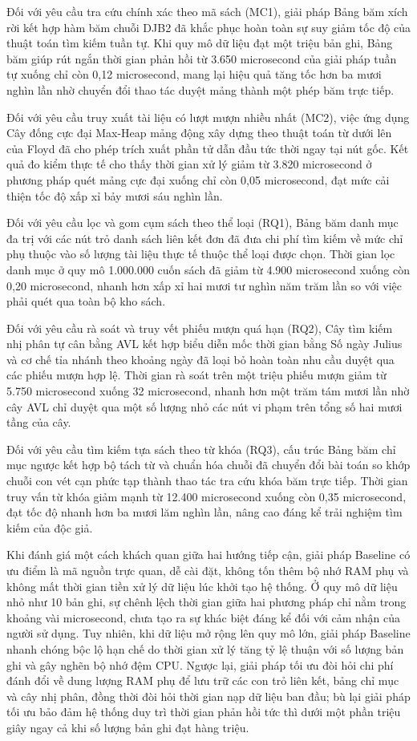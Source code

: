 \documentclass[14pt,a4paper]{extarticle}
\begin{document}
Đối với yêu cầu tra cứu chính xác theo mã sách (MC1), giải pháp Bảng băm xích rời kết hợp hàm băm chuỗi DJB2 đã khắc phục hoàn toàn sự suy giảm tốc độ của thuật toán tìm kiếm tuần tự. Khi quy mô dữ liệu đạt một triệu bản ghi, Bảng băm giúp rút ngắn thời gian phản hồi từ 3.650 microsecond của giải pháp tuần tự xuống chỉ còn 0,12 microsecond, mang lại hiệu quả tăng tốc hơn ba mươi nghìn lần nhờ chuyển đổi thao tác duyệt mảng thành một phép băm trực tiếp.

Đối với yêu cầu truy xuất tài liệu có lượt mượn nhiều nhất (MC2), việc ứng dụng Cây đống cực đại Max-Heap mảng động xây dựng theo thuật toán từ dưới lên của Floyd đã cho phép trích xuất phần tử dẫn đầu tức thời ngay tại nút gốc. Kết quả đo kiểm thực tế cho thấy thời gian xử lý giảm từ 3.820 microsecond ở phương pháp quét mảng cực đại xuống chỉ còn 0,05 microsecond, đạt mức cải thiện tốc độ xấp xỉ bảy mươi sáu nghìn lần.

Đối với yêu cầu lọc và gom cụm sách theo thể loại (RQ1), Bảng băm danh mục đa trị với các nút trỏ danh sách liên kết đơn đã đưa chi phí tìm kiếm về mức chỉ phụ thuộc vào số lượng tài liệu thực tế thuộc thể loại được chọn. Thời gian lọc danh mục ở quy mô 1.000.000 cuốn sách đã giảm từ 4.900 microsecond xuống còn 0,20 microsecond, nhanh hơn xấp xỉ hai mươi tư nghìn năm trăm lần so với việc phải quét qua toàn bộ kho sách.

Đối với yêu cầu rà soát và truy vết phiếu mượn quá hạn (RQ2), Cây tìm kiếm nhị phân tự cân bằng AVL kết hợp biểu diễn mốc thời gian bằng Số ngày Julius và cơ chế tỉa nhánh theo khoảng ngày đã loại bỏ hoàn toàn nhu cầu duyệt qua các phiếu mượn hợp lệ. Thời gian rà soát trên một triệu phiếu mượn giảm từ 5.750 microsecond xuống 32 microsecond, nhanh hơn một trăm tám mươi lần nhờ cây AVL chỉ duyệt qua một số lượng nhỏ các nút vi phạm trên tổng số hai mươi tầng của cây.

Đối với yêu cầu tìm kiếm tựa sách theo từ khóa (RQ3), cấu trúc Bảng băm chỉ mục ngược kết hợp bộ tách từ và chuẩn hóa chuỗi đã chuyển đổi bài toán so khớp chuỗi con vét cạn phức tạp thành thao tác tra cứu khóa băm trực tiếp. Thời gian truy vấn từ khóa giảm mạnh từ 12.400 microsecond xuống còn 0,35 microsecond, đạt tốc độ nhanh hơn ba mươi lăm nghìn lần, nâng cao đáng kể trải nghiệm tìm kiếm của độc giả.

Khi đánh giá một cách khách quan giữa hai hướng tiếp cận, giải pháp Baseline có ưu điểm là mã nguồn trực quan, dễ cài đặt, không tốn thêm bộ nhớ RAM phụ và không mất thời gian tiền xử lý dữ liệu lúc khởi tạo hệ thống. Ở quy mô dữ liệu nhỏ như 10 bản ghi, sự chênh lệch thời gian giữa hai phương pháp chỉ nằm trong khoảng vài microsecond, chưa tạo ra sự khác biệt đáng kể đối với cảm nhận của người sử dụng. Tuy nhiên, khi dữ liệu mở rộng lên quy mô lớn, giải pháp Baseline nhanh chóng bộc lộ hạn chế do thời gian xử lý tăng tỷ lệ thuận với số lượng bản ghi và gây nghẽn bộ nhớ đệm CPU. Ngược lại, giải pháp tối ưu đòi hỏi chi phí đánh đổi về dung lượng RAM phụ để lưu trữ các con trỏ liên kết, bảng chỉ mục và cây nhị phân, đồng thời đòi hỏi thời gian nạp dữ liệu ban đầu; bù lại giải pháp tối ưu bảo đảm hệ thống duy trì thời gian phản hồi tức thì dưới một phần triệu giây ngay cả khi số lượng bản ghi đạt hàng triệu.
\end{document}
